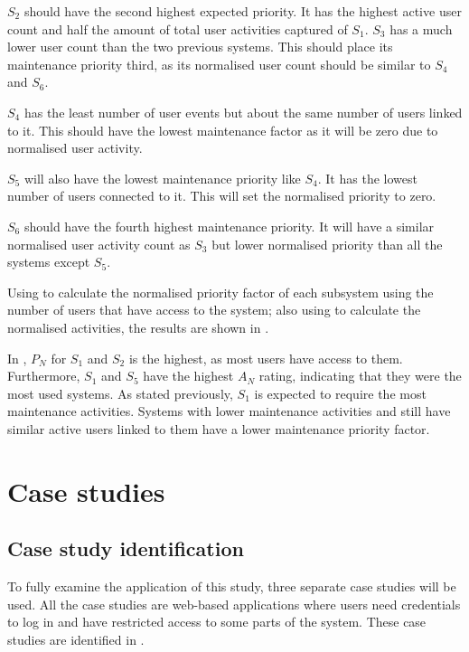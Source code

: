 $S_2$ should have the second highest expected priority. It has the highest active user count and half the amount of total user activities captured of $S_1$. $S_3$ has a much lower user count than the two previous systems. This should place its maintenance priority third, as its normalised user count should be similar to $S_4$ and $S_6$.\par $S_4$ has the least number of user events but about the same number of users linked to it. This should have the lowest maintenance factor as it will be zero due to normalised user activity. \par $S_5$ will also have the lowest maintenance priority like $S_4$. It has the lowest number of users connected to it. This will set the normalised priority to zero. \par $S_6$ should have the fourth highest maintenance priority. It will have a similar normalised user activity count as $S_3$ but lower normalised priority than all the systems except $S_5$. \par Using  to calculate the normalised priority factor of each subsystem using the number of users that have access to the system; also using  to calculate the normalised activities, the results are shown in .



In , $P_N$ for $S_1$ and $S_2$ is the highest, as most users have access to them. Furthermore, $S_1$ and $S_5$ have the highest $A_N$ rating, indicating that they were the most used systems. As stated previously, $S_1$ is expected to require the most maintenance activities. Systems with lower maintenance activities and still have similar active users linked to them have a lower maintenance priority factor.

\clearpage

\section{Case studies}\label{sec:ch3_caseStudies}

\subsection{Case study identification}
To fully examine the application of this study, three separate case studies will be used. All the case studies are web-based applications where users need credentials to log in and have restricted access to some parts of the system. These case studies are identified in .

